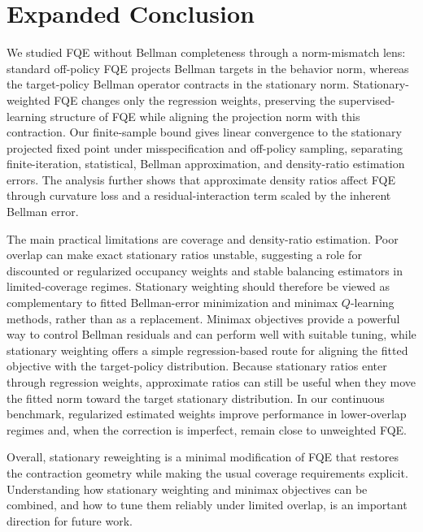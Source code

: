 \documentclass{article}
\theoremstyle{plain}
\theoremstyle{definition}
\theoremstyle{remark}
\begin{document}
 




 
 
 

\appendix

\section{Expanded Conclusion}
 \label{app:additional-conclusion}

We studied FQE without Bellman completeness through a norm-mismatch lens:
standard off-policy FQE projects Bellman targets in the behavior norm, whereas
the target-policy Bellman operator contracts in the stationary norm.
Stationary-weighted FQE changes only the regression weights, preserving the
supervised-learning structure of FQE while aligning the projection norm with
this contraction. Our finite-sample bound gives linear convergence to the
stationary projected fixed point under misspecification and off-policy sampling,
separating finite-iteration, statistical, Bellman approximation, and
density-ratio estimation errors. The analysis further shows that approximate
density ratios affect FQE through curvature loss and a residual-interaction term
scaled by the inherent Bellman error.

The main practical limitations are coverage and density-ratio estimation. Poor
overlap can make exact stationary ratios unstable, suggesting a role for
discounted or regularized occupancy weights and stable balancing estimators in
limited-coverage regimes. Stationary weighting should therefore be viewed as
complementary to fitted Bellman-error minimization and minimax \(Q\)-learning
methods, rather than as a replacement. Minimax objectives provide a powerful way
to control Bellman residuals and can perform well with suitable tuning, while
stationary weighting offers a simple regression-based route for aligning the
fitted objective with the target-policy distribution. Because stationary ratios
enter through regression weights, approximate ratios can still be useful when
they move the fitted norm toward the target stationary distribution. In our
continuous benchmark, regularized estimated weights improve performance in
lower-overlap regimes and, when the correction is imperfect, remain close to
unweighted FQE.

Overall, stationary reweighting is a minimal modification of FQE that restores
the contraction geometry while making the usual coverage requirements explicit.
Understanding how stationary weighting and minimax objectives can be combined,
and how to tune them reliably under limited overlap, is an important direction
for future work.
\end{document}
